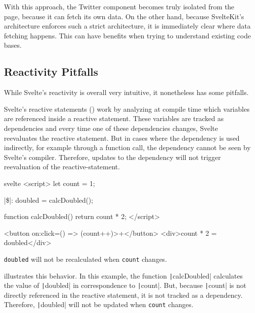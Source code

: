 With this approach, the Twitter component becomes truly isolated from the page, because it can fetch its own data. On the other hand, because SvelteKit's architecture enforces such a strict architecture, it is immediately clear where data fetching happens. This can have benefits when trying to understand existing code bases.


\subsection{Reactivity Pitfalls}
\label{sec:evaluation-reactivity pitfalls}
While Svelte's reactivity is overall very intuitive, it nonetheless has some pitfalls.

Svelte's reactive statements () work by analyzing at compile time which variables are referenced inside a reactive statement. These variables are tracked as dependencies and every time one of these dependencies changes, Svelte reevaluates the reactive statement. But in cases where the dependency is used indirectly, for example through a function call, the dependency cannot be seen by Svelte's compiler. Therefore, updates to the dependency will not trigger reevaluation of the reactive-statement.

\begin{listing}[h!]
\begin{myminted}[escapeinside=||, autogobble]{svelte}{}
<script>
    let count = 1;

    |\$|: doubled = calcDoubled();

    function calcDoubled() {
        return count * 2;
    }
</script>

<button on:click={() => (count++)}>+</button>
<div>{count} * 2 = {doubled}</div>
\end{myminted}
\caption{\texttt{doubled} will not be recalculated when \texttt{count} changes.}
\label{fig:evaluation-reactivity-hidden-dependency}
\end{listing}

 illustrates this behavior. In this example, the function \texttt|calcDoubled| calculates the value of \texttt|doubled| in correspondence to \texttt|count|. But, because \texttt|count| is not directly referenced in the reactive statement, it is not tracked as a dependency. Therefore, \texttt|doubled| will not be updated when \texttt{count} changes.

